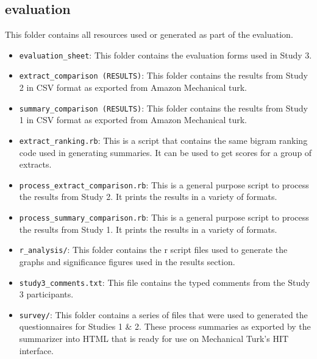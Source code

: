\subsection*{evaluation}
  This folder contains all resources used or generated as part of the evaluation.
  \begin{itemize}
    \item
      \texttt{evaluation\_sheet}: This folder contains the evaluation forms used in Study 3.
    \item
      \texttt{extract\_comparison\ (RESULTS)}: This folder contains the results from Study 2 in CSV format as exported from Amazon Mechanical turk.
    \item
      \texttt{summary\_comparison\ (RESULTS)}: This folder contains the results from Study 1 in CSV format as exported from Amazon Mechanical turk.
    \item
      \texttt{extract\_ranking.rb}: This is a script that contains the same bigram ranking code used in generating summaries. It can be used to get scores for a group of extracts.
    \item
      \texttt{process\_extract\_comparison.rb}: This is a general purpose script to process the results from Study 2. It prints the results in a variety of formats.
    \item
      \texttt{process\_summary\_comparison.rb}: This is a general purpose script to process the results from Study 1. It prints the results in a variety of formats.
    \item
      \texttt{r\_analysis/}: This folder contains the r script files used to generate the graphs and significance figures used in the results section.
    \item
      \texttt{study3\_comments.txt}: This file contains the typed comments from the Study 3 participants.
    \item
      \texttt{survey/}: This folder contains a series of files that were used to generated the questionnaires for Studies 1 \& 2. These process summaries as exported by the summarizer into HTML that is ready for use on Mechanical Turk's HIT interface.
  \end{itemize}

